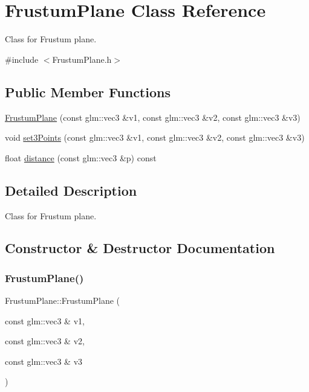 \hypertarget{class_frustum_plane}{}\section{Frustum\+Plane Class Reference}
\label{class_frustum_plane}


Class for Frustum plane.  




{\ttfamily \#include $<$Frustum\+Plane.\+h$>$}

\subsection*{Public Member Functions}
\begin{DoxyCompactItemize}
\item 
\mbox{\hyperlink{class_frustum_plane_a8199d02374fe7f01f9610593059cac92}{Frustum\+Plane}} (const glm\+::vec3 \&v1, const glm\+::vec3 \&v2, const glm\+::vec3 \&v3)
\item 
void \mbox{\hyperlink{class_frustum_plane_a3678151d513b029d839f602a1624707b}{set3\+Points}} (const glm\+::vec3 \&v1, const glm\+::vec3 \&v2, const glm\+::vec3 \&v3)
\item 
float \mbox{\hyperlink{class_frustum_plane_a82f59e8cbd67a6d3b5ffaf91c1ff8e32}{distance}} (const glm\+::vec3 \&p) const
\end{DoxyCompactItemize}


\subsection{Detailed Description}
Class for Frustum plane. 



\subsection{Constructor \& Destructor Documentation}
\mbox{\label{class_frustum_plane_a8199d02374fe7f01f9610593059cac92}} 
\subsubsection{\texorpdfstring{FrustumPlane()}{FrustumPlane()}}
{\footnotesize\ttfamily Frustum\+Plane\+::\+Frustum\+Plane (\begin{DoxyParamCaption}\item[{const glm\+::vec3 \&}]{v1,  }\item[{const glm\+::vec3 \&}]{v2,  }\item[{const glm\+::vec3 \&}]{v3 }\end{DoxyParamCaption})}

